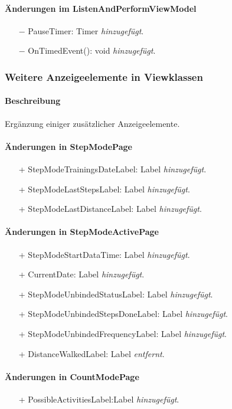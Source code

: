 \documentclass[a4paper,12pt]{article}
\begin{document}
\paragraph{Änderungen im ListenAndPerformViewModel}
\begin{itemize}
	\item[$-$] PauseTimer: Timer \textit{hinzugefügt}.
	\item[$-$] OnTimedEvent(): void \textit{hinzugefügt}.
\end{itemize}

\subsubsection{Weitere Anzeigeelemente in Viewklassen}
\paragraph{Beschreibung}
Ergänzung einiger zusätzlicher Anzeigeelemente.
\paragraph{Änderungen in StepModePage}
\begin{itemize}
	\item[+] StepModeTrainingsDateLabel: Label \textit{hinzugefügt}.
	\item[+] StepModeLastStepsLabel: Label \textit{hinzugefügt}.
	\item[+] StepModeLastDistanceLabel: Label \textit{hinzugefügt}.
\end{itemize}
\paragraph{Änderungen in StepModeActivePage}
\begin{itemize}
	\item[+] StepModeStartDataTime: Label \textit{hinzugefügt}.
	\item[+] CurrentDate: Label \textit{hinzugefügt}.
	\item[+] StepModeUnbindedStatusLabel: Label \textit{hinzugefügt}.
	\item[+] StepModeUnbindedStepsDoneLabel: Label \textit{hinzugefügt}.
	\item[+] StepModeUnbindedFrequencyLabel: Label \textit{hinzugefügt}.
	\item[+] DistanceWalkedLabel: Label \textit{entfernt}.
\end{itemize}
\paragraph{Änderungen in CountModePage}
\begin{itemize}
	\item[+] PossibleActivitiesLabel:Label \textit{hinzugefügt}.
\end{itemize}
\end{document}
